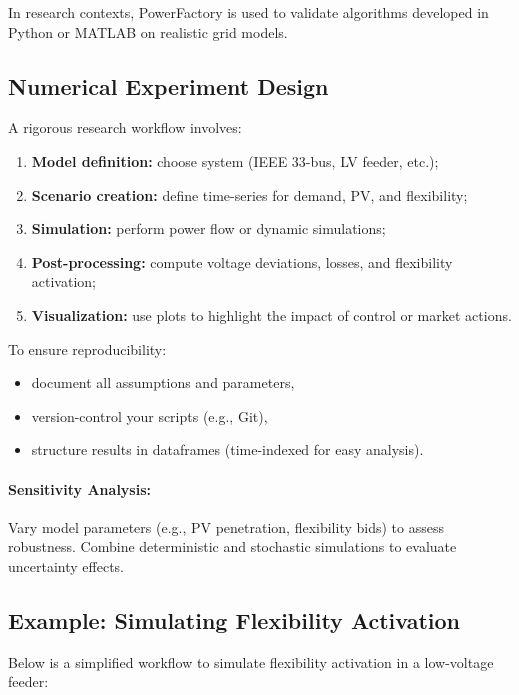 \documentclass[11pt]{article}
\begin{document}
	In research contexts, PowerFactory is used to validate algorithms developed in Python or MATLAB on realistic grid models.
	
	
	\subsection{Numerical Experiment Design}
	
	A rigorous research workflow involves:
	\begin{enumerate}
		\item \textbf{Model definition:} choose system (IEEE 33-bus, LV feeder, etc.);
		\item \textbf{Scenario creation:} define time-series for demand, PV, and flexibility;
		\item \textbf{Simulation:} perform power flow or dynamic simulations;
		\item \textbf{Post-processing:} compute voltage deviations, losses, and flexibility activation;
		\item \textbf{Visualization:} use plots to highlight the impact of control or market actions.
	\end{enumerate}
	
	To ensure reproducibility:
	\begin{itemize}
		\item document all assumptions and parameters,
		\item version-control your scripts (e.g., Git),
		\item structure results in dataframes (time-indexed for easy analysis).
	\end{itemize}
	
	\paragraph{Sensitivity Analysis:}
	Vary model parameters (e.g., PV penetration, flexibility bids) to assess robustness.  
	Combine deterministic and stochastic simulations to evaluate uncertainty effects.
	
	
	\subsection{Example: Simulating Flexibility Activation}
	
	Below is a simplified workflow to simulate flexibility activation in a low-voltage feeder:
	
\end{document}
